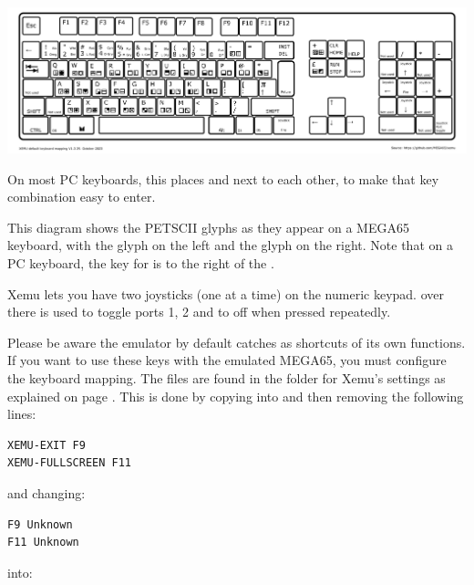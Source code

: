 \begin{center}
  \includegraphics[width=\linewidth]{images/xemu-extended-keyboard.png}
\end{center}

On most PC keyboards, this places  and  next to each
other, to make that key combination easy to enter.

This diagram shows the PETSCII glyphs as they appear on a MEGA65 keyboard, with the
\megasymbolkey glyph on the left and the  glyph on the right. Note
that on a PC keyboard, the key for \megasymbolkey is to the right of the
.

Xemu lets you have two joysticks (one at a time) on the numeric keypad.
 over there is used to toggle ports 1, 2 and to off when pressed
repeatedly.

Please be aware the emulator by default catches  
 as shortcuts of its own functions. If you want to use these keys with the
emulated MEGA65, you must configure the keyboard mapping. The files are found in the
folder for Xemu's settings as explained on page
\pageref{sec:sdcard-settings-location}. This is done by copying
 into  and then removing the following lines:

\begin{tcolorbox}[colback=black,coltext=white]
\verbatimfont{\codefont}
\begin{verbatim}
XEMU-EXIT F9
XEMU-FULLSCREEN F11
\end{verbatim}
\end{tcolorbox}

and changing:

\begin{tcolorbox}[colback=black,coltext=white]
\verbatimfont{\codefont}
\begin{verbatim}
F9 Unknown
F11 Unknown
\end{verbatim}
\end{tcolorbox}

into:

